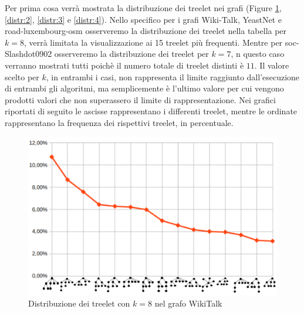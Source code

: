 Per prima cosa verrà mostrata la distribuzione dei treelet nei grafi (Figure \ref{distr:1}, \ref{distr:2}, \ref{distr:3} e \ref{distr:4}).
Nello specifico per i grafi Wiki-Talk, YeastNet e road-luxembourg-osm osserveremo la distribuzione dei treelet nella tabella per $ k = 8 $, verrà limitata la visualizzazione ai 15 treelet più frequenti.
Mentre per soc-Slashdot0902 osserveremo la distribuzione dei treelet per $ k=7 $, 
 n questo caso verranno mostrati tutti poichè il numero totale di treelet distinti è $11$.
Il valore scelto per $ k $, in entrambi i casi, non rappresenta il limite raggiunto dall'esecuzione di entrambi gli algoritmi, ma semplicemente è l'ultimo valore per cui vengono prodotti valori che non superassero il limite di rappresentazione. %
Nei grafici riportati di seguito le ascisse rappresentano i differenti treelet, mentre le ordinate rappresentano la frequenza dei rispettivi treelet, in percentuale.
\renewcommand{\thefigure}{\arabic{figure}}
\begin{figure}[htbp]
	\centering
	\includegraphics[width=\textwidth]{capitolo4/grafoWIKI}
		\caption{Distribuzione dei treelet con $ k=8 $ nel grafo WikiTalk}
		\label{distr:1}
\end{figure}\mbox{}
\\\\\\\\\\\\

